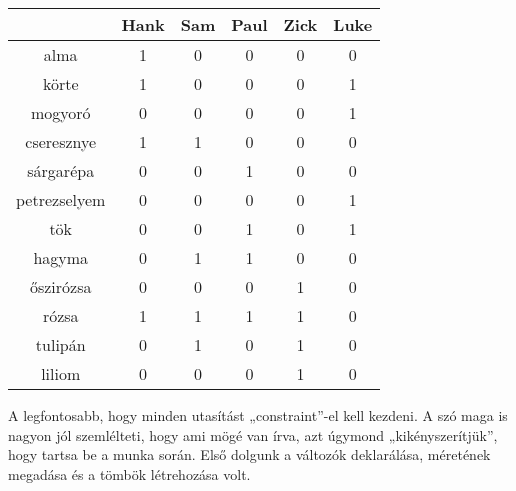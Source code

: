 \documentclass[12pt,a4paper,twoside, openright]{report}
\begin{document}
	\begin{table}
		\centering
		\caption{}
		\begin{tabular}{|c|c|c|c|c|c|}
			\hline 
			& Hank & Sam & Paul & Zick & Luke \\ 
			\hline 
			alma & 1 & 0 & 0 & 0 & 0 \\ 
			\hline 
			körte & 1 & 0 & 0 & 0 & 1 \\ 
			\hline 
			mogyoró & 0 & 0 & 0 & 0 & 1 \\ 
			\hline 
			cseresznye & 1 & 1 & 0 & 0 & 0 \\ 
			\hline 
			sárgarépa & 0 & 0 & 1 & 0 & 0 \\ 
			\hline 
			petrezselyem & 0 & 0 & 0 & 0 & 1 \\ 
			\hline 
			tök & 0 & 0 & 1 & 0 & 1 \\ 
			\hline 
			hagyma & 0 & 1 & 1 & 0 & 0 \\ 
			\hline 
			őszirózsa & 0 & 0 & 0 & 1 & 0 \\ 
			\hline 
			rózsa & 1 & 1 & 1 & 1 & 0 \\ 
			\hline 
			tulipán & 0 & 1 & 0 & 1 & 0 \\ 
			\hline 
			liliom & 0 & 0 & 0 & 1 & 0 \\ 
			\hline 
		\end{tabular}
	\end{table}
     
    A legfontosabb, hogy minden utasítást „constraint”-el kell kezdeni.
    A szó maga is nagyon jól szemlélteti, hogy ami mögé van írva, azt úgymond „kikényszerítjük”, hogy tartsa be a munka során.
    Első dolgunk a változók deklarálása, méretének megadása és a tömbök létrehozása volt.
\end{document}
